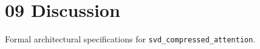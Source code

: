 \section{09 Discussion}

Formal architectural specifications for \texttt{svd_compressed_attention}.
